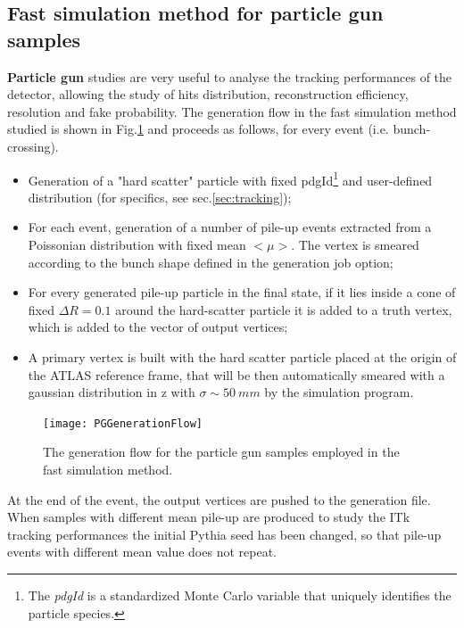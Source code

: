 \documentclass[a4paper,twoside,12pt]{article}
\begin{document}
\subsection{Fast simulation method for particle gun samples}\label{sec:simulation:pg}

\textbf{Particle gun} studies are very useful to analyse the tracking performances of the
detector, allowing the study of hits distribution, reconstruction efficiency, resolution and
fake probability. The generation flow in the fast simulation method studied is shown in Fig.\ref{fig:PGGenerationFlow} and proceeds as follows,
for every event (i.e. bunch-crossing).\\
\begin{itemize}
\item Generation of a "hard scatter" particle with fixed pdgId\footnote{The \textit{pdgId} 
is a standardized Monte Carlo variable that uniquely identifies the particle species.} and 
user-defined distribution (for specifics, see sec.\ref{sec:tracking});
\item For each event, generation of a number of pile-up events extracted from a Poissonian
distribution with fixed mean $<\mu>$. The vertex is smeared according to the bunch shape
defined in the generation job option;
\item For every generated pile-up particle in the final state, if it lies inside a cone of fixed
$\Delta R = 0.1$ around the hard-scatter particle it is added to a truth vertex, which is added to the vector of output vertices;
\item A primary vertex is built with the hard scatter particle placed at the origin of the
ATLAS reference frame, that will be then automatically smeared with a gaussian distribution
in z with $\sigma \sim 50\ mm$ by the simulation program.
\end{itemize}

\begin{figure} [h]
	\texttt{[image: PGGenerationFlow]}
	\caption{The generation flow for the particle gun samples employed in the fast 
	simulation method. }
	\label{fig:PGGenerationFlow}
\end{figure}

At the end of the event, the output vertices are pushed to the generation file.\\

When samples with different mean pile-up are produced to study the ITk tracking
performances the initial Pythia seed has been changed, so that pile-up events with
different mean value does not repeat. \\
\end{document}
